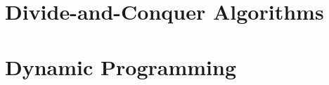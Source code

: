 \documentclass{article}
\newcommand{\LoadSection}[1]{{}}
\begin{document}
\thispagestyle{plain}
\MakeCustomTitle
\bigskip


{
    \hypersetup{linkcolor=black}
    \tableofcontents
}

\newpage

\section{Divide-and-Conquer Algorithms}
\label{sec:dynamic-programming}

    \LoadSection{divide-and-conquer/karatsuba-multiplication}
    \LoadSection{divide-and-conquer/fast-fourier-transform}

\newpage
\section{Dynamic Programming}
\label{sec:dynamic-programming}

    \LoadSection{dynamic-programming/fibonacci-sequence}
    \LoadSection{dynamic-programming/01-knapsack-problem}

%
\end{document}
